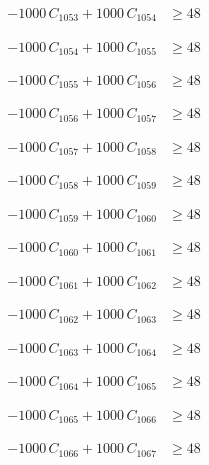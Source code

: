 \documentclass[a4paper,11pt]{article}
\begin{document}
\begin{align}
-1000\,C_{1053} + 1000\,C_{1054} &\geq 48 \nonumber
\end{align}

\begin{align}
-1000\,C_{1054} + 1000\,C_{1055} &\geq 48 \nonumber
\end{align}

\begin{align}
-1000\,C_{1055} + 1000\,C_{1056} &\geq 48 \nonumber
\end{align}

\begin{align}
-1000\,C_{1056} + 1000\,C_{1057} &\geq 48 \nonumber
\end{align}

\begin{align}
-1000\,C_{1057} + 1000\,C_{1058} &\geq 48 \nonumber
\end{align}

\begin{align}
-1000\,C_{1058} + 1000\,C_{1059} &\geq 48 \nonumber
\end{align}

\begin{align}
-1000\,C_{1059} + 1000\,C_{1060} &\geq 48 \nonumber
\end{align}

\begin{align}
-1000\,C_{1060} + 1000\,C_{1061} &\geq 48 \nonumber
\end{align}

\begin{align}
-1000\,C_{1061} + 1000\,C_{1062} &\geq 48 \nonumber
\end{align}

\begin{align}
-1000\,C_{1062} + 1000\,C_{1063} &\geq 48 \nonumber
\end{align}

\begin{align}
-1000\,C_{1063} + 1000\,C_{1064} &\geq 48 \nonumber
\end{align}

\begin{align}
-1000\,C_{1064} + 1000\,C_{1065} &\geq 48 \nonumber
\end{align}

\begin{align}
-1000\,C_{1065} + 1000\,C_{1066} &\geq 48 \nonumber
\end{align}

\begin{align}
-1000\,C_{1066} + 1000\,C_{1067} &\geq 48 \nonumber
\end{align}
\end{document}

